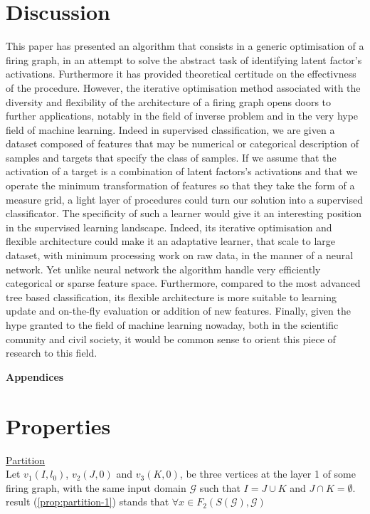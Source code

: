 \documentclass[a4paper, 11pt]{article}
\begin{document}
\section{Discussion}

This paper has presented an algorithm that consists in a generic optimisation of a firing graph, in an attempt to solve the abstract task of identifying latent factor's activations. Furthermore it has provided theoretical certitude on the effectivness of the procedure. However, the iterative optimisation method associated with the diversity and flexibility of the architecture of a firing graph opens doors to further applications, notably in the field of inverse problem and in the very hype field of machine learning. Indeed in supervised classification, we are given a dataset composed of features that may be numerical or categorical description of samples and targets that specify the class of samples. If we assume that the activation of a target is a combination of latent factors's activations and that we operate the minimum transformation of features so that they take the form of a measure grid, a light layer of procedures could turn our solution into a supervised classificator. The specificity of such a learner would give it an interesting position in the supervised learning landscape. Indeed, its iterative optimisation and flexible architecture could make it an adaptative learner, that scale to large dataset, with minimum processing work on raw data, in the manner of a neural network. Yet unlike neural network the algorithm handle very efficiently categorical or sparse feature space. Furthermore, compared to the most advanced tree based classification, its flexible architecture is more suitable to learning update and on-the-fly evaluation or addition of new features. Finally, given the hype granted to the field of machine learning nowaday, both in the scientific comunity and civil society, it would be common sense to orient this piece of research to this field.     


\newpage
\begin{center}
\LARGE \textbf{Appendices}
\end{center}
\appendix

\section{Properties}

\underline{Partition}\\

Let $v_1(I, l_0)$, $v_2(J, 0)$ and $v_3(K, 0)$, be three vertices at the layer 1 of some firing graph, with the same input domain $\mathcal{G}$ such that $I = J \cup K$ and $J \cap K = \emptyset$. result (\ref{prop:partition-1}) stands that $\forall x \in F_2(S(\mathcal{G}), \mathcal{G})$
\end{document}
